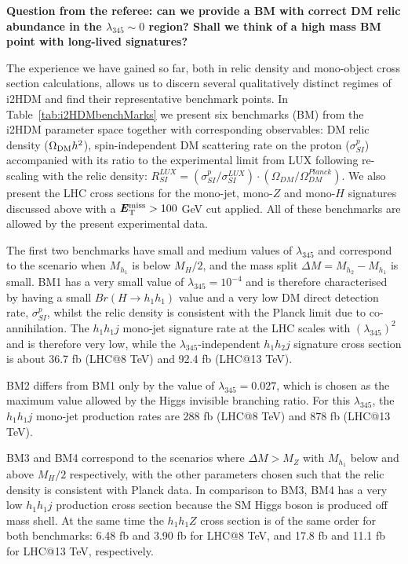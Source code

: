 \documentclass[12pt,a4paper]{article}
\newcommand {\red} {\color{red}}
\newcommand{\MET}{\textbf{\textit{E}$_{\rm T}^{\rm miss}$}}
\begin{document}
{\red \bf Question from the referee: can we provide a BM with correct DM relic abundance in the $\lambda_{345}\sim 0$ region? Shall we think of a high mass BM point with long-lived signatures? }

The experience we have gained so far, both in relic density and mono-object cross section calculations,
allows us to discern several qualitatively distinct regimes
of i2HDM and find their representative benchmark points.
In Table~\ref{tab:i2HDMbenchMarks} we present six benchmarks (BM) from the i2HDM  parameter space
together with corresponding observables: DM relic density ($\Omega_{\rm DM} h^2$),
 spin-independent  DM scattering rate on the proton ($\sigma_{SI}^p$)
accompanied with its ratio to the experimental limit from LUX following re-scaling with the relic density: 
$R_{SI}^{LUX} =(\sigma_{SI}^p/\sigma_{SI}^{LUX})\cdot (\Omega_{DM}/\Omega_{DM}^{Planck})$.
We also present the LHC cross sections for the mono-jet, mono-$Z$ and mono-$H$ signatures
discussed above with a $\MET > 100$ GeV cut applied.
All of these benchmarks are allowed by the present experimental data.

The first two benchmarks have small and medium values of $\lambda_{345}$ and correspond to the 
scenario when $M_{h_1}$ is below $M_H/2$, and the mass split $\Delta M = M_{h_2}-M_{h_1}$ is small.
BM1 has a very small value of  $\lambda_{345}=10^{-4}$ and is therefore characterised 
by having a small $Br(H\to h_1 h_1)$ value and a very low DM direct detection rate, $\sigma^p_{SI}$,
whilst the relic density is consistent with the Planck limit {due to co-annihilation}.
The $h_1h_1j$ mono-jet signature rate at the LHC scales with $(\lambda_{345})^2$ and is therefore very low,
while the $\lambda_{345}$-independent $h_1h_2j$ signature cross section 
is about 36.7 fb (LHC@8 TeV) and 92.4 fb (LHC@13 TeV).

BM2 differs from BM1 only by the value of $\lambda_{345}=0.027$, which is chosen as the maximum value 
allowed by the Higgs invisible branching ratio. For this $\lambda_{345}$,
the $h_1 h_1 j$ mono-jet production rates are 288 fb (LHC@8 TeV) and 878 fb (LHC@13 TeV).

BM3 and BM4 correspond to the scenarios where $\Delta M > M_Z$
with $M_{h_1}$ below and above $M_H/2$ respectively,
{with the other parameters chosen such that the} relic density is consistent with Planck data.
In comparison to BM3, BM4 has a very low $h_1h_1j$ production cross section because
the SM Higgs boson is produced off mass shell.
At the same time the $h_1 h_1 Z$ cross section 
is of the same order for both benchmarks: 6.48 fb and 3.90 fb for LHC@8 TeV,
and 17.8 fb and 11.1 fb for LHC@13 TeV, respectively.
\end{document}
